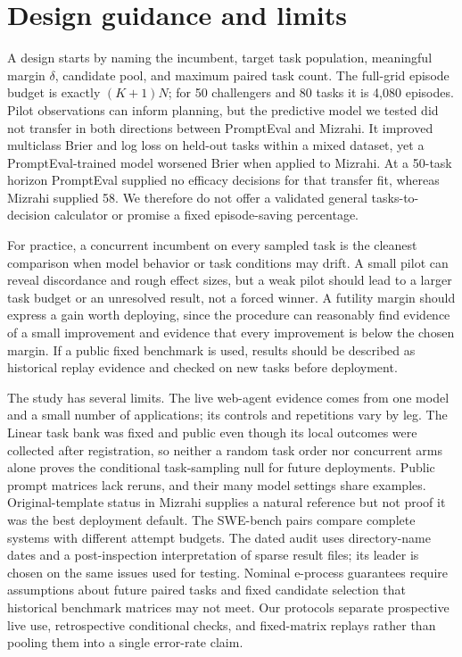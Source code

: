 \documentclass[11pt]{article}
\begin{document}
\section{Design guidance and limits}
\label{sec:discussion}
A design starts by naming the incumbent, target task population, meaningful margin $\delta$, candidate pool, and maximum paired task count. The full-grid episode budget is exactly $(K+1)N$; for 50 challengers and 80 tasks it is 4,080 episodes. Pilot observations can inform planning, but the predictive model we tested did not transfer in both directions between PromptEval and Mizrahi. It improved multiclass Brier and log loss on held-out tasks within a mixed dataset, yet a PromptEval-trained model worsened Brier when applied to Mizrahi. At a 50-task horizon PromptEval supplied no efficacy decisions for that transfer fit, whereas Mizrahi supplied 58. We therefore do not offer a validated general tasks-to-decision calculator or promise a fixed episode-saving percentage.

For practice, a concurrent incumbent on every sampled task is the cleanest comparison when model behavior or task conditions may drift. A small pilot can reveal discordance and rough effect sizes, but a weak pilot should lead to a larger task budget or an unresolved result, not a forced winner. A futility margin should express a gain worth deploying, since the procedure can reasonably find evidence of a small improvement and evidence that every improvement is below the chosen margin. If a public fixed benchmark is used, results should be described as historical replay evidence and checked on new tasks before deployment.

The study has several limits. The live web-agent evidence comes from one model and a small number of applications; its controls and repetitions vary by leg. The Linear task bank was fixed and public even though its local outcomes were collected after registration, so neither a random task order nor concurrent arms alone proves the conditional task-sampling null for future deployments. Public prompt matrices lack reruns, and their many model settings share examples. Original-template status in Mizrahi supplies a natural reference but not proof it was the best deployment default. The SWE-bench pairs compare complete systems with different attempt budgets. The dated audit uses directory-name dates and a post-inspection interpretation of sparse result files; its leader is chosen on the same issues used for testing. Nominal e-process guarantees require assumptions about future paired tasks and fixed candidate selection that historical benchmark matrices may not meet. Our protocols separate prospective live use, retrospective conditional checks, and fixed-matrix replays rather than pooling them into a single error-rate claim.
\end{document}
